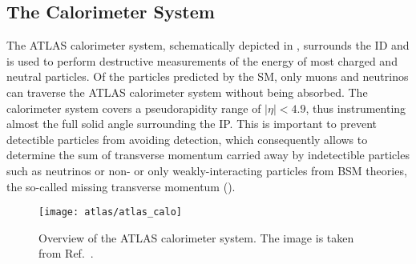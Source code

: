 \subsection{The Calorimeter System}

The ATLAS calorimeter system, schematically depicted in
, surrounds the ID and is used to perform
destructive measurements of the energy of most charged and neutral particles. Of
the particles predicted by the SM, only muons and neutrinos can traverse the
ATLAS calorimeter system without being absorbed. The calorimeter system covers a
pseudorapidity range of $|\eta| < 4.9$, thus instrumenting almost the full solid
angle surrounding the IP. This is important to prevent detectible particles from
avoiding detection, which consequently allows to determine the sum of transverse
momentum carried away by indetectible particles such as neutrinos or non- or
only weakly-interacting particles from BSM theories, the so-called missing
transverse momentum ().


\begin{figure}[htbp]
  \centering

  \texttt{[image: atlas/atlas\_calo]}

  \caption{Overview of the ATLAS calorimeter system. The image is taken from
    Ref.~\cite{PERF-2007-01}.}%
  \label{fig:atlas_calorimeters}
\end{figure}

